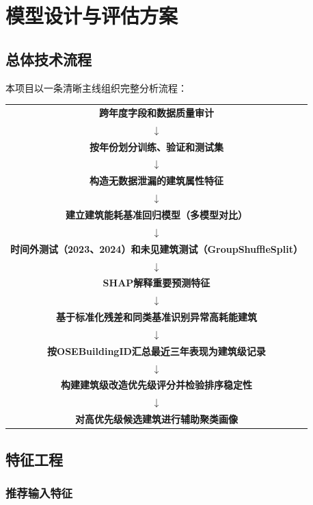 \section{模型设计与评估方案}

\subsection{总体技术流程}

本项目以一条清晰主线组织完整分析流程：

\begin{center}
\begin{tabular}{c}
\hline
\textbf{跨年度字段和数据质量审计} \\
$\downarrow$ \\
\textbf{按年份划分训练、验证和测试集} \\
$\downarrow$ \\
\textbf{构造无数据泄漏的建筑属性特征} \\
$\downarrow$ \\
\textbf{建立建筑能耗基准回归模型（多模型对比）} \\
$\downarrow$ \\
\textbf{时间外测试（2023、2024）和未见建筑测试（GroupShuffleSplit）} \\
$\downarrow$ \\
\textbf{SHAP解释重要预测特征} \\
$\downarrow$ \\
\textbf{基于标准化残差和同类基准识别异常高耗能建筑} \\
$\downarrow$ \\
\textbf{按OSEBuildingID汇总最近三年表现为建筑级记录} \\
$\downarrow$ \\
\textbf{构建建筑级改造优先级评分并检验排序稳定性} \\
$\downarrow$ \\
\textbf{对高优先级候选建筑进行辅助聚类画像} \\
\hline
\end{tabular}
\end{center}

\subsection{特征工程}

\subsubsection{推荐输入特征}

